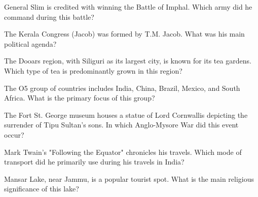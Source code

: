 \documentclass[12pt,a4paper]{book}
\begin{document}
\begin{enhancedmcq}[Question 25]{General Slim is credited with winning the Battle of Imphal. Which army did he command during this battle?}
\end{enhancedmcq}

\begin{enhancedmcq}[Question 26]{The Kerala Congress (Jacob) was formed by T.M. Jacob. What was his main political agenda?}
\end{enhancedmcq}

\begin{enhancedmcq}[Question 27]{The Dooars region, with Siliguri as its largest city, is known for its tea gardens. Which type of tea is predominantly grown in this region?}
\end{enhancedmcq}

\begin{enhancedmcq}[Question 28]{The O5 group of countries includes India, China, Brazil, Mexico, and South Africa. What is the primary focus of this group?}
\end{enhancedmcq}

\begin{enhancedmcq}[Question 29]{The Fort St. George museum houses a statue of Lord Cornwallis depicting the surrender of Tipu Sultan's sons. In which Anglo-Mysore War did this event occur?}
\end{enhancedmcq}

\begin{enhancedmcq}[Question 30]{Mark Twain's "Following the Equator" chronicles his travels. Which mode of transport did he primarily use during his travels in India?}
\end{enhancedmcq}

\begin{enhancedmcq}[Question 31]{Mansar Lake, near Jammu, is a popular tourist spot. What is the main religious significance of this lake?}
\end{enhancedmcq}
\end{document}
